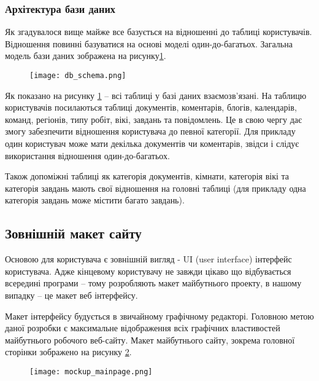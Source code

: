 \subsubsection{Архітектура бази даних}
Як згадувалося вище майже все базується на відношенні до таблиці користувачів. Відношення повинні базуватися на основі моделі один-до-багатьох. Загальна модель бази даних зображена на рисунку\ref{pic:db_shema}.
\begin{figure}[!ht]
\centering
		\texttt{[image: db\_schema.png]}
		\label{pic:db_shema}
\end{figure}
\par Як показано на рисунку \ref{pic:db_shema} -- всі таблиці у базі даних взаємозв'язані. На таблицю користувачів посилаються таблиці документів, коментарів, блогів, календарів, команд, регіонів, типу робіт, вікі, завдань та повідомлень. 
Це в свою чергу дає змогу забезпечити відношення користувача до певної категорії. 
Для прикладу один користувач може мати декілька документів чи коментарів, звідси і слідує використання відношення один-до-багатьох. 
\par Також допоміжні таблиці як категорія документів, кімнати, категорія вікі та категорія завдань мають свої відношення на головні таблиці (для прикладу одна категорія завдань може містити багато завдань).


\subsection{Зовнішній макет сайту}
Основою для користувача є зовнішній вигляд - UI (user interface) інтерфейс користувача. 
Адже кінцевому користувачу не завжди цікаво що відбувається всередині програми -- тому розробляють макет майбутнього проекту, в нашому випадку -- це макет веб інтерфейсу. 
\par Макет інтерфейсу будується в звичайному графічному редакторі. Головною метою даної розробки є максимальне відображення всіх графічних властивостей майбутнього робочого веб-сайту. Макет майбутнього сайту, зокрема головної сторінки зображено на рисунку \ref{pic:mockup}.

\begin{figure}[!ht]
\centering
		\texttt{[image: mockup\_mainpage.png]}
		\label{pic:mockup}
\end{figure}

